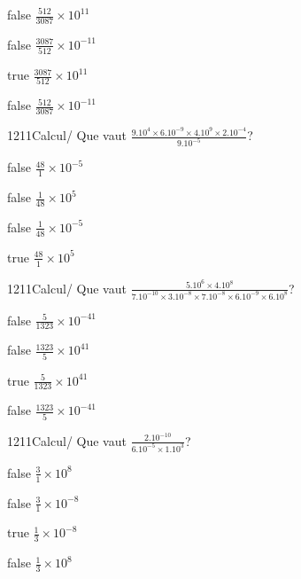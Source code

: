             \begin{reponses}
                \item[false] $\frac{512}{3087}\times 10^{11}$
                \item[false] $\frac{3087}{512}\times 10^{-11}$
                \item[true] $\frac{3087}{512}\times 10^{11}$
                \item[false] $\frac{512}{3087}\times 10^{-11}$
            \end{reponses}
            \begin{question}{1211}{Calcul}{}{/}
                Que vaut $\frac{9.10^{4}\times 6.10^{-9}\times 4.10^{9}\times 2.10^{-4}}{9.10^{-5}}$?
            \end{question}
            \begin{reponses}
                \item[false] $\frac{48}{1}\times 10^{-5}$
                \item[false] $\frac{1}{48}\times 10^{5}$
                \item[false] $\frac{1}{48}\times 10^{-5}$
                \item[true] $\frac{48}{1}\times 10^{5}$
            \end{reponses}
            \begin{question}{1211}{Calcul}{}{/}
                Que vaut $\frac{5.10^{6}\times 4.10^{8}}{7.10^{-10}\times 3.10^{-8}\times 7.10^{-8}\times 6.10^{-9}\times 6.10^{8}}$?
            \end{question}
            \begin{reponses}
                \item[false] $\frac{5}{1323}\times 10^{-41}$
                \item[false] $\frac{1323}{5}\times 10^{41}$
                \item[true] $\frac{5}{1323}\times 10^{41}$
                \item[false] $\frac{1323}{5}\times 10^{-41}$
            \end{reponses}
            \begin{question}{1211}{Calcul}{}{/}
                Que vaut $\frac{2.10^{-10}}{6.10^{-5}\times 1.10^{3}}$?
            \end{question}
            \begin{reponses}
                \item[false] $\frac{3}{1}\times 10^{8}$
                \item[false] $\frac{3}{1}\times 10^{-8}$
                \item[true] $\frac{1}{3}\times 10^{-8}$
                \item[false] $\frac{1}{3}\times 10^{8}$
            \end{reponses}
